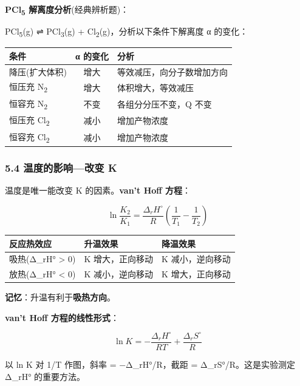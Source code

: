 \textbf{PCl\textsubscript{5} 解离度分析}(经典辨析题)：

PCl\textsubscript{5}(g) ⇌ PCl\textsubscript{3}(g) + Cl\textsubscript{2}(g)，分析以下条件下解离度 α 的变化：

{\def\LTcaptype{none} %
\begin{longtable}[]{@{}lcl@{}}
\toprule\noalign{}
条件 & α 的变化 & 分析 \\
\midrule\noalign{}
\endhead
\bottomrule\noalign{}
\endlastfoot
降压(扩大体积) & 增大 & 等效减压，向分子数增加方向 \\
恒压充 N\textsubscript{2} & 增大 & 体积增大，等效减压 \\
恒容充 N\textsubscript{2} & 不变 & 各组分分压不变，Q 不变 \\
恒压充 Cl\textsubscript{2} & 减小 & 增加产物浓度 \\
恒容充 Cl\textsubscript{2} & 减小 & 增加产物浓度 \\
\end{longtable}
}

\subsubsection{5.4 温度的影响---改变 K}\label{ux6e29ux5ea6ux7684ux5f71ux54cdux6539ux53d8-k}

温度是唯一能改变 K 的因素。\textbf{van't Hoff 方程}：

\[
\boxed{\ln\frac{K_2}{K_1} = \frac{\Delta_rH^\circ}{R}\left(\frac{1}{T_1} - \frac{1}{T_2}\right)}
\]

{\def\LTcaptype{none} %
\begin{longtable}[]{@{}lll@{}}
\toprule\noalign{}
反应热效应 & 升温效果 & 降温效果 \\
\midrule\noalign{}
\endhead
\bottomrule\noalign{}
\endlastfoot
吸热(Δ\_rH° \textgreater{} 0) & K 增大，正向移动 & K 减小，逆向移动 \\
放热(Δ\_rH° \textless{} 0) & K 减小，逆向移动 & K 增大，正向移动 \\
\end{longtable}
}

\textbf{记忆}：升温有利于\textbf{吸热方向}。

\textbf{van't Hoff 方程的线性形式}：

\[
\ln K = -\frac{\Delta_rH^\circ}{RT} + \frac{\Delta_rS^\circ}{R}
\]

以 ln K 对 1/T 作图，斜率 = −Δ\_rH°/R，截距 = Δ\_rS°/R。这是实验测定 Δ\_rH° 的重要方法。

